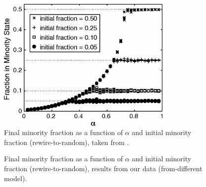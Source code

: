 \documentclass[11pt]{article}
\begin{document}
\begin{figure}
  \centering
  \includegraphics[height=65mm]{rwToRandomBifDiag}
  \caption{Final minority fraction as a function of $\alpha$ and initial minority fraction (rewire-to-random), taken from \cite{durret:pnas12}.}
  \label{fig:durretRWtoRandomBD}
\end{figure}

\begin{figure}
  \centering
  \hspace{3mm}
  \caption{Final minority fraction as a function of $\alpha$ and initial minority fraction (rewire-to-random), results from our data (from-different model).}
  \label{fig:myRWtoRandomFromDiffBD}
\end{figure}
\end{document}
